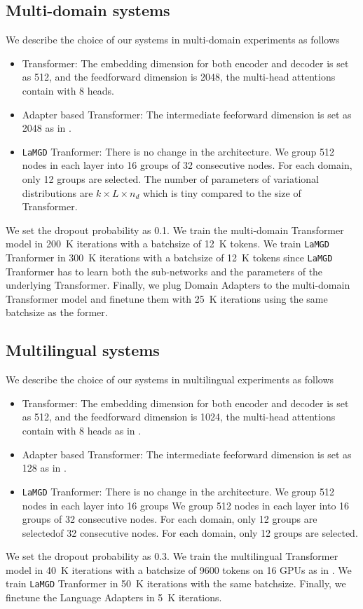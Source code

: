 \documentclass[11pt]{article}
\newcommand{\system}[1]{\texttt{{#1}}}
\begin{document}
\subsection{Multi-domain systems}
We describe the choice of our systems in multi-domain experiments as follows
\begin{itemize}
	\item Transformer: The embedding dimension for both encoder and decoder is set as 512, and the feedforward dimension is 2048, the multi-head attentions contain with 8 heads.
	\item Adapter based Transformer: The intermediate feeforward dimension is set as 2048 as in \citet{Pham21Revisiting}.
	\item \system{LaMGD} Tranformer: There is no change in the architecture. We group 512 nodes in each layer into 16 groups of 32 consecutive nodes. For each domain, only 12 groups are selected. The number of parameters of variational distributions are $k \times L \times n_d$ which is tiny compared to the size of Transformer.
\end{itemize}

We set the dropout probability as 0.1. We train the multi-domain Transformer model in 200~K iterations with a batchsize of 12~K tokens. We train \system{LaMGD} Tranformer in 300~K iterations with a batchsize of 12~K tokens since \system{LaMGD} Tranformer has to learn both the sub-networks and the parameters of the underlying Transformer. Finally, we plug Domain Adapters to the multi-domain Transformer model and finetune them with 25~K iterations using the same batchsize as the former.
\subsection{Multilingual systems}
We describe the choice of our systems in multilingual experiments as follows
\begin{itemize}
	\item Transformer: The embedding dimension for both encoder and decoder is set as 512, and the feedforward dimension is 1024, the multi-head attentions contain with 8 heads as in \citet{Wang20balancing}.
	\item Adapter based Transformer: The intermediate feeforward dimension is set as 128 as in \citet{Gong21adaptive}.
	\item \system{LaMGD} Tranformer: There is no change in the architecture. We group 512 nodes in each layer into 16 groups We group 512 nodes in each layer into 16 groups of 32 consecutive nodes. For each domain, only 12 groups are selectedof 32 consecutive nodes. For each domain, only 12 groups are selected. 
\end{itemize}

We set the dropout probability as 0.3. We train the multilingual Transformer model in 40~K iterations with a batchsize of 9600 tokens on 16 GPUs as in \citet{Gong21adaptive}. We train \system{LaMGD} Tranformer in 50~K iterations with the same batchsize. Finally, we finetune the Language Adapters in 5~K iterations.
\end{document}
